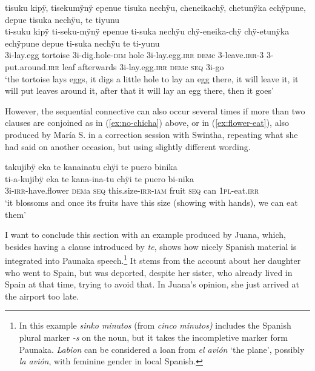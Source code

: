 \ea\label{ex:tortoise-egg}
\begingl
\glpreamble tisuku kipÿ, tisekumÿnÿ epenue tisuka nechÿu, cheneikachÿ, chetunÿka echÿpune, depue tisuka nechÿu, te tiyunu\\
\gla ti-suku kipÿ ti-seku-mÿnÿ epenue ti-suka nechÿu chÿ-eneika-chÿ chÿ-etunÿka echÿpune depue ti-suka nechÿu te ti-yunu\\
\glb 3i-lay.egg tortoise 3i-dig.hole-\textsc{dim} hole 3i-lay.egg.\textsc{irr} \textsc{dem}c 3-leave.\textsc{irr}-3 3-put.around.\textsc{irr} leaf afterwards 3i-lay.egg.\textsc{irr} \textsc{dem}c \textsc{seq} 3i-go\\
\glft ‘the tortoise lays eggs, it digs a little hole to lay an egg there, it will leave it, it will put leaves around it, after that it will lay an egg there, then it goes’
\endgl
\trailingcitation{[rxx-e121128s-1.088]}
\xe

However, the sequential connective can also occur several times if more than two clauses are conjoined as in (\ref{ex:no-chicha}) above, or in (\ref{ex:flower-eat}), also produced by María S. in a correction session with Swintha, repeating what she had said on another occasion, but using slightly different wording.

\ea\label{ex:flower-eat}
\begingl
\glpreamble takujibÿ eka te kanainatu chÿi te puero binika\\
\gla ti-a-kujibÿ eka te kana-ina-tu chÿi te puero bi-nika\\
\glb 3i-\textsc{irr}-have.flower \textsc{dem}a \textsc{seq} this.size-\textsc{irr}-\textsc{iam} fruit \textsc{seq} can 1\textsc{pl}-eat.\textsc{irr}\\
\glft ‘it blossoms and once its fruits have this size (showing with hands), we can eat them’
\endgl
\trailingcitation{[rxx-e121126s-3.16]}
\xe

I want to conclude this section with an example produced by Juana, which, besides having a clause introduced by \textit{te}, shows how nicely Spanish material is integrated into Paunaka speech.\footnote{In this example \textit{sinko minutos} (from \textit{cinco minutos)} includes the Spanish plural marker \textit{-s} on the noun, but it takes the incompletive marker form Paunaka. \textit{Labion} can be considered a loan from \textit{el avión} ‘the plane’, possibly \textit{la avión}, with feminine gender in local Spanish.} It stems from the account about her daughter who went to Spain, but was deported, despite her sister, who already lived in Spain at that time, trying to avoid that. In Juana’s opinion, she just arrived at the airport too late.

